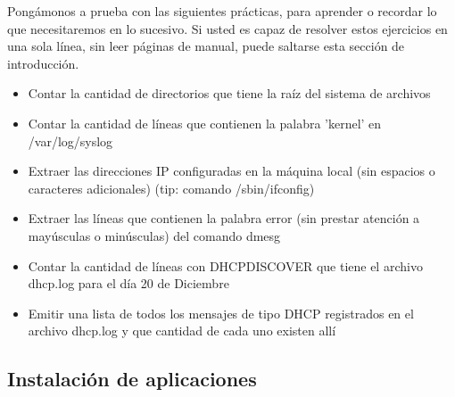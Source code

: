 \begin{frame}

    Pongámonos a prueba con las siguientes prácticas, para aprender o recordar
    lo que necesitaremos en lo sucesivo. Si usted es capaz de resolver estos
    ejercicios en una sola línea, sin leer páginas de manual, puede
    saltarse esta sección de introducción. \\[0.2cm]

    \begin{itemize}
        \item Contar la cantidad de directorios que tiene la raíz del sistema
        de archivos
        \item Contar la cantidad de líneas que contienen la palabra 'kernel' en
        /var/log/syslog
        \item Extraer las direcciones IP configuradas en la máquina local (sin
        espacios o caracteres adicionales) (tip: comando /sbin/ifconfig)
        \item Extraer las líneas que contienen la palabra error (sin prestar
        atención a mayúsculas o minúsculas) del comando dmesg
        \item Contar la cantidad de líneas con DHCPDISCOVER que tiene el
        archivo dhcp.log para el día 20 de Diciembre
        \item Emitir una lista de todos los mensajes de tipo DHCP registrados
        en el archivo dhcp.log y que cantidad de cada uno existen allí
    \end{itemize}
    
\end{frame}

\subsection{Instalación de aplicaciones} %

